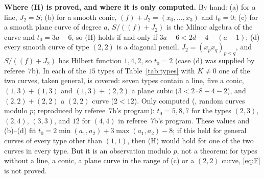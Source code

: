 \documentclass[11pt]{article}
\numberwithin{equation}{section}
\theoremstyle{remark}
\newcommand{\run}[1]{\medskip\noindent\textbf{#1}}
\begin{document}
\run{Where \textup{(H)} is proved, and where it is only computed.} By hand: (a) for a line, $J_2=S$; (b) for
a smooth conic, $(f)+J_2=(x_0,\dots,x_3)$ and $t_0=0$; (c) for a smooth plane curve of degree $a$,
$S/((f)+J_2)$ is the Milnor algebra of the curve and $t_0=3a-6$, so (H) holds if and only if
$3a-6<2d-4-(a-1)$; (d) every smooth curve of type $(2,2)$ is a diagonal pencil, $J_2=(x_px_q)_{p<q}$, and
$S/((f)+J_2)$ has Hilbert function $1,4,2$, so $t_0=2$ (case (d) was supplied by referee~7b). In each of the
$15$ types of Table~\ref{tab:types} with $K\neq0$ one of the two curves, taken general, is covered: seven types
contain a line, five a conic, $(1,3)+(1,3)$ and $(1,3)+(2,2)$ a plane cubic ($3<2\cdot8-4-2$), and
$(2,2)+(2,2)$ a $(2,2)$ curve ($2<12$). Only computed (, random curves modulo
$p$; reproduced by referee~7b's program): $t_0=5,8,7$ for the types $(2,3)$, $(2,4)$, $(3,3)$, and $12$ for
$(4,4)$ in referee~7b's program. These
values and (b)--(d) fit $t_0=2\min(a_1,a_2)+3\max(a_1,a_2)-8$; if this held for general curves of every type
other than $(1,1)$, then (H) would hold for one of the two curves in every type. But it is an observation modulo
$p$, not a theorem: for types without a line, a conic, a plane curve in the range of (c) or a $(2,2)$ curve,
\eqref{eq:F} is not proved.
\end{document}
